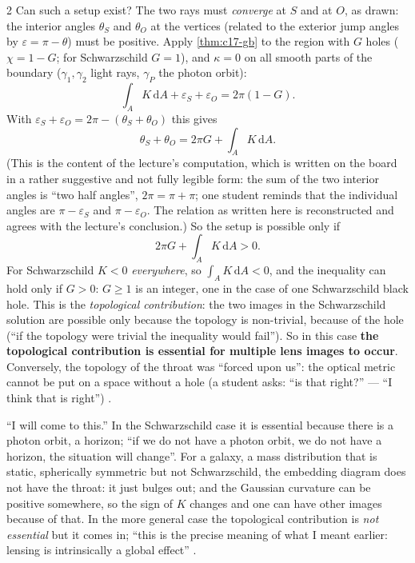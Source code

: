 \begin{paracol}{2}
Can such a setup exist? The two rays must \emph{converge} at $S$ and at $O$, as drawn: the interior angles $\theta_S$ and $\theta_O$ at the vertices (related to the exterior jump angles by $\varepsilon=\pi-\theta$) must be positive. Apply \cref{thm:c17-gb} to the region with $G$ holes ($\chi=1-G$; for Schwarzschild $G=1$), and $\kappa=0$ on all smooth parts of the boundary ($\gamma_1,\gamma_2$ light rays, $\gamma_P$ the photon orbit):
\[
  \int_AK\,\mathrm dA+\varepsilon_S+\varepsilon_O=2\pi(1-G).
\]
With $\varepsilon_S+\varepsilon_O=2\pi-(\theta_S+\theta_O)$ this gives
\begin{equation}\label{eq:c17-images}
  \theta_S+\theta_O=2\pi G+\int_AK\,\mathrm dA.
\end{equation}
(This is the content of the lecture's computation, which is written on the board in a rather suggestive and not fully legible form: the sum of the two interior angles is ``two half angles'', $2\pi=\pi+\pi$; one student reminds that the individual angles are $\pi-\varepsilon_S$ and $\pi-\varepsilon_O$. The relation as written here is reconstructed and agrees with the lecture's conclusion.) So the setup is possible only if
\[
  2\pi G+\int_AK\,\mathrm dA>0.
\]
For Schwarzschild $K<0$ \emph{everywhere}, so $\int_AK\,\mathrm dA<0$, and the inequality can hold only if $G>0$: $G\geq1$ is an integer, one in the case of one Schwarzschild black hole. This is the \emph{topological contribution}: the two images in the Schwarzschild solution are possible only because the topology is non-trivial, because of the hole (``if the topology were trivial the inequality would fail''). So in this case \textbf{the topological contribution is essential for multiple lens images to occur}. Conversely, the topology of the throat was ``forced upon us'': the optical metric cannot be put on a space without a hole (a student asks: ``is that right?'' --- ``I think that is right'') .
\begin{coursenote}
``I will come to this.'' In the Schwarzschild case it is essential because there is a photon orbit, a horizon; ``if we do not have a photon orbit, we do not have a horizon, the situation will change''. For a galaxy, a mass distribution that is static, spherically symmetric but not Schwarzschild, the embedding diagram does not have the throat: it just bulges out; and the Gaussian curvature can be positive somewhere, so the sign of $K$ changes and one can have other images because of that. In the more general case the topological contribution is \emph{not essential} but it comes in; ``this is the precise meaning of what I meant earlier: lensing is intrinsically a global effect'' .

\end{coursenote}
\end{paracol}
